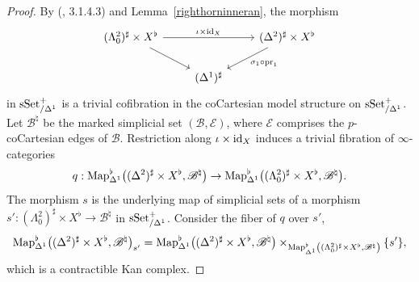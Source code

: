 \documentclass{tac}
\newcommand{\s}[1]{\mathscr{#1}}
\newcommand{\tx}[1]{\textnormal{#1}}
\begin{document}
\begin{proof}
By (\cite{htt}, 3.1.4.3) and Lemma~\ref{righthorninneran}, the morphism 
\[\begin{tikzcd} (\Lambda^2_0)^\sharp \times X^\flat \arrow[]{rr}{\iota\times \tx{id}_X} \arrow[]{dr} & & (\Delta^2)^\sharp \times X^\flat \arrow[]{dl}{\sigma_1 \circ \tx{pr}_1} \\
& (\Delta^1)^\sharp &
\end{tikzcd}\]
in $\tx{sSet}^+_{/ \Delta^1}$ is a trivial cofibration in the coCartesian model structure on $\tx{sSet}^+_{/ \Delta^1}$.  Let $\s{B}^\natural$ be the marked simplicial set $(\s{B}, \s{E})$, where $\s{E}$ comprises the $p$-coCartesian edges of $\s{B}$. Restriction along $\iota \times \tx{id}_X$ induces a trivial fibration of $\infty$-categories
\[ q : \tx{Map}^\flat_{\Delta^1} \big( (\Delta^2)^\sharp \times X^\flat , \s{B}^\natural \big) \to \tx{Map}^\flat_{\Delta^1} \big( (\Lambda^2_0)^\sharp \times X^\flat , \s{B}^\natural \big). \]
The morphism $s$ is the underlying map of simplicial sets of a morphism $s' : (\Lambda^2_0)^\sharp \times X^\flat \to \s{B}^\natural$ in $\tx{sSet}^+_{/ \Delta^1}$.  Consider the fiber of $q$ over $s'$,
\[ \tx{Map}^\flat_{\Delta^1} \big( (\Delta^2)^\sharp \times X^\flat , \s{B}^\natural \big)_{s'} = \tx{Map}^\flat_{\Delta^1} \big( (\Delta^2)^\sharp \times X^\flat , \s{B}^\natural \big) \times_{ \tx{Map}^\flat_{\Delta^1} \left( (\Lambda^2_0)^\sharp \times X^\flat , \s{B}^\natural \right)} \{s' \}, \]
which is a contractible Kan complex.  


\end{proof}
\end{document}
